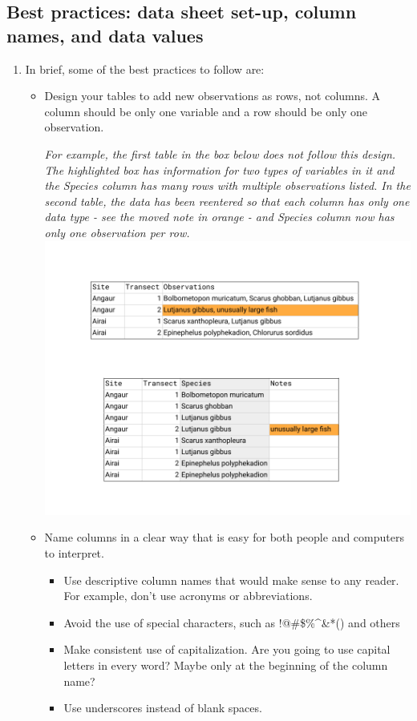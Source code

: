 \documentclass[
]{book}
\begin{document}
\hypertarget{best-practices-data-sheet-set-up-column-names-and-data-values}{%
\subsection{Best practices: data sheet set-up, column names, and data values}\label{best-practices-data-sheet-set-up-column-names-and-data-values}}

\begin{enumerate}
\def\labelenumi{\arabic{enumi}.}
\item
  In brief, some of the best practices to follow are:

  \begin{itemize}
  \item
    Design your tables to add new observations as rows, not columns. A column should be only one variable and a row should be only one observation.

    \emph{For example, the first table in the box below does not follow this design. The highlighted box has information for two types of variables in it and the Species column has many rows with multiple observations listed. In the second table, the data has been reentered so that each column has only one data type - see the moved note in orange - and Species column now has only one observation per row.}
    \includegraphics{images/M2S2_image1_observations_in_rows_and_columns.png}
  \item
    Name columns in a clear way that is easy for both people and computers to interpret.

    \begin{itemize}
    \item
      Use descriptive column names that would make sense to any reader. For example, don't use acronyms or abbreviations.
    \item
      Avoid the use of special characters, such as !@\#\$\%\^{}\&*() and others
    \item
      Make consistent use of capitalization. Are you going to use capital letters in every word? Maybe only at the beginning of the column name?
    \item
      Use underscores instead of blank spaces.


\end{itemize}
\end{itemize}
\end{enumerate}
\end{document}
